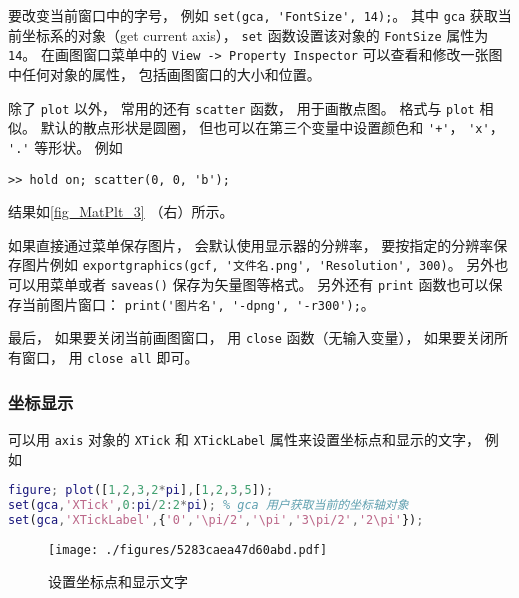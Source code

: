 要改变当前窗口中的字号， 例如 \verb|set(gca, 'FontSize', 14);|。 其中 \verb|gca| 获取当前坐标系的对象（get current axis）， \verb|set| 函数设置该对象的 \verb|FontSize| 属性为 \verb|14|。 在画图窗口菜单中的 \verb|View -> Property Inspector| 可以查看和修改一张图中任何对象的属性， 包括画图窗口的大小和位置。

除了 \verb|plot| 以外， 常用的还有 \verb|scatter| 函数， 用于画散点图。 格式与 \verb|plot| 相似。 默认的散点形状是圆圈， 但也可以在第三个变量中设置颜色和 \verb|'+'|， \verb|'x'|， \verb|'.'| 等形状。 例如
\begin{lstlisting}[language=matlabC]
>> hold on; scatter(0, 0, 'b');
\end{lstlisting}
结果如\autoref{fig_MatPlt_3} （右）所示。

如果直接通过菜单保存图片， 会默认使用显示器的分辨率， 要按指定的分辨率保存图片例如 \verb|exportgraphics(gcf, '文件名.png', 'Resolution', 300)|。 另外也可以用菜单或者 \verb|saveas()| 保存为矢量图等格式。 另外还有 \verb|print| 函数也可以保存当前图片窗口： \verb|print('图片名', '-dpng', '-r300');|。

最后， 如果要关闭当前画图窗口， 用 \verb|close| 函数（无输入变量）， 如果要关闭所有窗口， 用 \verb|close all| 即可。

\subsubsection{坐标显示}
可以用 \verb|axis| 对象的 \verb|XTick| 和 \verb|XTickLabel| 属性来设置坐标点和显示的文字， 例如 
\begin{lstlisting}[language=matlab]
figure; plot([1,2,3,2*pi],[1,2,3,5]);
set(gca,'XTick',0:pi/2:2*pi); % gca 用户获取当前的坐标轴对象
set(gca,'XTickLabel',{'0','\pi/2','\pi','3\pi/2','2\pi'});
\end{lstlisting}
\begin{figure}[ht]
\centering
\texttt{[image: ./figures/5283caea47d60abd.pdf]}
\caption{设置坐标点和显示文字} \label{fig_MatPlt_4}
\end{figure}
